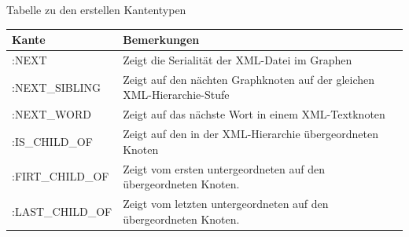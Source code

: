 \documentclass[12pt,ngerman,]{article}
\begin{document}
Tabelle zu den erstellen Kantentypen

\begin{longtable}[]{@{}ll@{}}
\toprule
\begin{minipage}[b]{0.22\columnwidth}\raggedright\strut
Kante\strut
\end{minipage} & \begin{minipage}[b]{0.72\columnwidth}\raggedright\strut
Bemerkungen\strut
\end{minipage}\tabularnewline
\midrule
\endhead
\begin{minipage}[t]{0.22\columnwidth}\raggedright\strut
:NEXT\strut
\end{minipage} & \begin{minipage}[t]{0.72\columnwidth}\raggedright\strut
Zeigt die Serialität der XML-Datei im Graphen\strut
\end{minipage}\tabularnewline
\begin{minipage}[t]{0.22\columnwidth}\raggedright\strut
:NEXT\_SIBLING\strut
\end{minipage} & \begin{minipage}[t]{0.72\columnwidth}\raggedright\strut
Zeigt auf den nächten Graphknoten auf der gleichen
XML-Hierarchie-Stufe\strut
\end{minipage}\tabularnewline
\begin{minipage}[t]{0.22\columnwidth}\raggedright\strut
:NEXT\_WORD\strut
\end{minipage} & \begin{minipage}[t]{0.72\columnwidth}\raggedright\strut
Zeigt auf das nächste Wort in einem XML-Textknoten\strut
\end{minipage}\tabularnewline
\begin{minipage}[t]{0.22\columnwidth}\raggedright\strut
:IS\_CHILD\_OF\strut
\end{minipage} & \begin{minipage}[t]{0.72\columnwidth}\raggedright\strut
Zeigt auf den in der XML-Hierarchie übergeordneten Knoten\strut
\end{minipage}\tabularnewline
\begin{minipage}[t]{0.22\columnwidth}\raggedright\strut
:FIRT\_CHILD\_OF\strut
\end{minipage} & \begin{minipage}[t]{0.72\columnwidth}\raggedright\strut
Zeigt vom ersten untergeordneten auf den übergeordneten Knoten.\strut
\end{minipage}\tabularnewline
\begin{minipage}[t]{0.22\columnwidth}\raggedright\strut
:LAST\_CHILD\_OF\strut
\end{minipage} & \begin{minipage}[t]{0.72\columnwidth}\raggedright\strut
Zeigt vom letzten untergeordneten auf den übergeordneten Knoten.\strut
\end{minipage}\tabularnewline
\bottomrule
\end{longtable}
\end{document}
